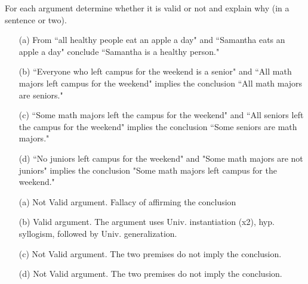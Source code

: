 \documentclass[12pt,addpoints]{exam}
\newcommand{\ra}{\rightarrow}
\begin{document}
\begin{questions}
\begin{solution}
\begin{itemize}[itemsep=0pt,parsep=0pt,topsep=0pt,partopsep=0pt]
    \end{itemize}
\end{solution}


\question[16] For each argument determine whether it is valid or not and explain why (in a sentence or two).
    \begin{itemize}[itemsep=0pt,parsep=0pt,topsep=0pt,partopsep=0pt]
    \item[(a)] From  ``all healthy people eat an apple a day" and  ``Samantha eats an apple a day" conclude ``Samantha is a healthy person."  
    \item[(b)] ``Everyone who left campus for the weekend is a senior" and ``All math majors left campus for the weekend"  implies the conclusion ``All math majors are seniors." 
    \item[(c)] ``Some math majors left the campus for the weekend" and ``All seniors left the campus for the weekend" implies the conclusion ``Some seniors are math majors."
    \item[(d)] ``No juniors left campus for the weekend" and "Some math majors are not juniors" implies the conclusion "Some math majors left campus for the weekend."
    \end{itemize}
   \ifprintanswers
        \vspace{-10pt}
    \fi
\begin{solution}
    \begin{itemize}
        \item[(a)] Not Valid argument.  Fallacy of affirming the conclusion
        \item[(b)] Valid argument. The argument uses Univ. instantiation (x2), hyp. syllogism, followed by Univ. generalization.
        \item[(c)] Not Valid argument.  The two premises do not imply the conclusion.
        \item[(d)] Not Valid argument.  The two premises do not imply the conclusion.
    \end{itemize}
\end{solution}



\end{questions}
\end{document}
